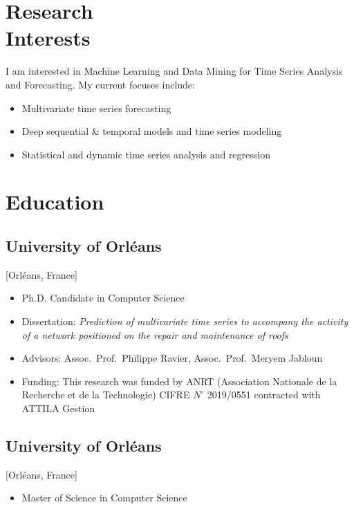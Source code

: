 \documentclass{mycv}
\begin{document}
\maketitle

\section{Research \\ Interests}

I am interested in Machine Learning and Data Mining for Time Series Analysis and Forecasting. My current focuses include:

\begin{itemize}
  \item Multivariate time series forecasting
  \item Deep sequential \& temporal models and time series modeling
  \item Statistical and dynamic time series analysis and regression
\end{itemize}

\section{Education}

\subsection{University of Orl\'eans}[Orl\'eans, France]
\begin{itemize}[label={}]
  \item Ph.D. Candidate in Computer Science 
  \item Dissertation: \textit{Prediction of multivariate time series to accompany the activity of a network positioned on the repair and maintenance of roofs}
  \item Advisors: Assoc.~Prof.~Philippe Ravier, Assoc.~Prof.~Meryem Jabloun
  \item Funding: This research was funded by ANRT (Association Nationale de la Recherche et de la Technologie) CIFRE $N^{\circ}$ 2019/0551 contracted with ATTILA Gestion
\end{itemize}

\subsection{University of Orl\'eans}[Orl\'eans, France]
\begin{itemize}[label={}]
  \item Master of Science in Computer Science 
\end{itemize}
\end{document}
